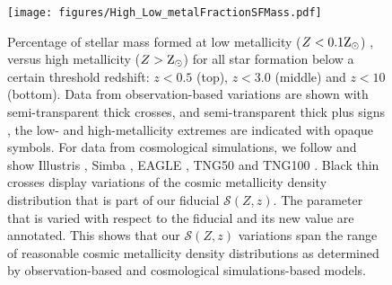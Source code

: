 \documentclass[linenumbers,twocolumn]{aastex631}
\newcommand{\SFRDzZ}{\ensuremath{\mathcal{S}(Z,z)}\xspace}
\begin{document}
\begin{figure}
\centering
{}
\texttt{[image: figures/High\_Low\_metalFractionSFMass.pdf]}
\caption{Percentage of stellar mass formed at low metallicity ($Z < 0.1 \rm{Z_{\odot}}$) , versus high metallicity ($Z>\rm{Z_{\odot}}$) for all star formation below a certain threshold redshift: $z<0.5$ (top), $z < 3.0$ (middle) and $z<10$ (bottom). Data from observation-based variations are shown with semi-transparent thick crosses,  \citep[][]{Chruslinska2019_obs} and semi-transparent thick plus signs \citep[][]{Chruslinska+2021}, the low- and high-metallicity extremes are indicated with opaque symbols. For data from cosmological simulations, we follow \cite{Pakmor+2022} and show Illustris \citep[][squares]{Vogelsberger+2014}, Simba \citep[][diamonds]{Dave+2019}, EAGLE \citep[][triangles]{Schaye+2015}, TNG50 and TNG100 \citep[][filled and open circles respectively]{FirstResTNG_Springel2018}. Black thin crosses display variations of the cosmic metallicity density distribution that is part of our fiducial \SFRDzZ. The parameter that is varied with respect to the fiducial and its new value are annotated. This shows that our \SFRDzZ variations span the range of reasonable cosmic metallicity density distributions as determined by observation-based and cosmological simulations-based models.
\label{fig: low high Z fraction}
  }
\end{figure}



\end{document}
